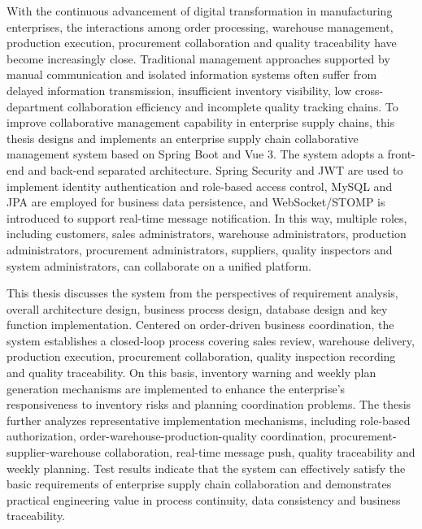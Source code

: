 \enabstract

With the continuous advancement of digital transformation in manufacturing enterprises, the interactions among order processing, warehouse management, production execution, procurement collaboration and quality traceability have become increasingly close. Traditional management approaches supported by manual communication and isolated information systems often suffer from delayed information transmission, insufficient inventory visibility, low cross-department collaboration efficiency and incomplete quality tracking chains. To improve collaborative management capability in enterprise supply chains, this thesis designs and implements an enterprise supply chain collaborative management system based on Spring Boot and Vue 3. The system adopts a front-end and back-end separated architecture. Spring Security and JWT are used to implement identity authentication and role-based access control, MySQL and JPA are employed for business data persistence, and WebSocket/STOMP is introduced to support real-time message notification. In this way, multiple roles, including customers, sales administrators, warehouse administrators, production administrators, procurement administrators, suppliers, quality inspectors and system administrators, can collaborate on a unified platform.

This thesis discusses the system from the perspectives of requirement analysis, overall architecture design, business process design, database design and key function implementation. Centered on order-driven business coordination, the system establishes a closed-loop process covering sales review, warehouse delivery, production execution, procurement collaboration, quality inspection recording and quality traceability. On this basis, inventory warning and weekly plan generation mechanisms are implemented to enhance the enterprise's responsiveness to inventory risks and planning coordination problems. The thesis further analyzes representative implementation mechanisms, including role-based authorization, order-warehouse-production-quality coordination, procurement-supplier-warehouse collaboration, real-time message push, quality traceability and weekly planning. Test results indicate that the system can effectively satisfy the basic requirements of enterprise supply chain collaboration and demonstrates practical engineering value in process continuity, data consistency and business traceability.

